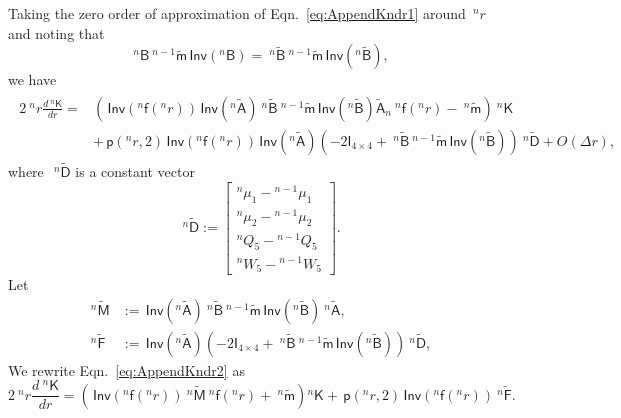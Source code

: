 \documentclass[preprint,10pt,times]{elsarticle}
\numberwithin{equation}{section}
\renewcommand{\u}[1]{\boldsymbol{#1}}
\newcommand{\usf}[1]{\u{\mathsf #1}}
\newcommand{\pr}[1]{\left( #1 \right)}
\newcommand{\p}{\,\mathsf{p}}
\newcommand{\Inv}{\,\mathsf{Inv}}
\renewcommand{\>}{$\Rightarrow$}
\begin{document}
Taking the zero order of approximation of Eqn.~\eqref{eq:AppendKndr1} around~${}^{n}\!{r}$ and noting that
\begin{equation}
	~^{n}{\usf{B}} ~^{n-1}\tilde{\usf{m}} \Inv\pr{{}^{n}\usf{B}} = ~^{n}\tilde{\usf{B}} ~^{n-1}\tilde{\usf{m}} \Inv\pr{{}^{n}\tilde{\usf{B}}},
\end{equation}
we have
\begin{equation}
\begin{aligned}
	\begin{split}
	2 ~^{n}\!{r} \frac{d ~^{n}{\usf{K}}}{dr} = & \left( \Inv\pr{{}^{n}\usf{f}({}^{n}\!r)} \Inv\pr{{}^{n}\tilde{\usf{A}}} ~^{n}\tilde{\usf{B}} ~^{n-1}\tilde{\usf{m}} \Inv\pr{{}^{n}\tilde{\usf{B}}} \tilde{\usf{A}}_n ~^{n}\usf{f}({}^{n}\!r) - ~^{n}\tilde{\usf{m}} \right) ~^{n}{\usf{K}} \\
	& + \p\pr{{}^{n}\!{r},2} \Inv\pr{{}^{n}\usf{f}({}^{n}\!r)} \Inv\pr{{}^{n}\tilde{\usf{A}}} \left( -2\usf{I}_{4\times 4} + ~^{n}\tilde{\usf{B}} ~^{n-1}\tilde{\usf{m}} \Inv\pr{{}^{n}\tilde{\usf{B}}} \right) ~^{n}\tilde{\usf{D}} + O(\Delta r),
	\end{split}
\end{aligned}
\label{eq:AppendKndr2}
\end{equation}
where~$~^{n}\tilde{\usf{D}}$ is a constant vector
\begin{equation}
	~^{n}\tilde{\usf{D}}
	:=
	\begin{bmatrix}
		{}^{n}\!{\mu_{1}}-{}^{n-1}\!{\mu_{1}} \\ {}^{n}\!{\mu_{2}}-{}^{n-1}\!{\mu_{2}}  \\ {}^{n}\!{Q_{5}}-{}^{n-1}\!{Q_{5}} \\ {}^{n}\!{W_{5}}-{}^{n-1}\!{W_{5}}
	\end{bmatrix} .
\end{equation}
Let
\begin{subequations}
	\begin{align}
	~^{n}\tilde{\usf{M}} & := \Inv\pr{{}^{n}\tilde{\usf{A}}} ~^{n}\tilde{\usf{B}} ~^{n-1}\tilde{\usf{m}} \Inv\pr{{}^{n}\tilde{\usf{B}}} ~^{n}\tilde{\usf{A}}, \\
	~^{n}\tilde{\usf{F}} & := \Inv\pr{{}^{n}\tilde{\usf{A}}} \left( -2\usf{I}_{4\times 4} + ~^{n}\tilde{\usf{B}} ~^{n-1}\tilde{\usf{m}} \Inv\pr{{}^{n}\tilde{\usf{B}}} \right) ~^{n}\tilde{\usf{D}},
	\end{align}
\end{subequations}
We rewrite Eqn.~\eqref{eq:AppendKndr2} as
\begin{equation}
	2 ~^{n}\!{r} \frac{d ~^{n}{\usf{K}}}{dr} = \left( \Inv\pr{{}^{n}\usf{f}({}^{n}\!r)} ~^{n}\tilde{\usf{M}} ~^{n}\usf{f}({}^{n}\!r) + ~^{n}\tilde{\usf{m}} \right) {}^{n}{\usf{K}} + \p\pr{{}^{n}\!{r},2} \Inv\pr{{}^{n}\usf{f}({}^{n}\!r)} ~^{n}\tilde{\usf{F}}.
	\label{eq:AppendKndr}
\end{equation}
\end{document}
